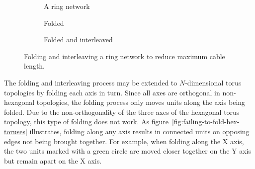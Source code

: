 		\begin{figure}
			\center
			\begin{subfigure}[b]{0.39\linewidth}
				\center
				\caption{A ring network}
				\label{fig:ring-folding-row}
			\end{subfigure}
			\begin{subfigure}[b]{0.24\linewidth}
				\center
				\caption{Folded}
				\label{fig:ring-folding-folded}
			\end{subfigure}
			\begin{subfigure}[b]{0.35\linewidth}
				\center
				\caption{Folded and interleaved}
				\label{fig:ring-folding-interleaved}
			\end{subfigure}
			
			\caption[Folding and interleaving a ring network.]%
			{Folding and interleaving a ring network to reduce maximum cable
			length.}
			\label{fig:ring-folding}
		\end{figure}
		
		The folding and interleaving process may be extended to $N$-dimensional
		torus topologies by folding each axis in turn. Since all axes are
		orthogonal in non-hexagonal topologies, the folding process only moves
		units along the axis being folded. Due to the non-orthogonality of the
		three axes of the hexagonal torus topology, this type of folding does not
		work. As figure~\ref{fig:failing-to-fold-hex-toruses} illustrates, folding
		along any axis results in connected units on opposing edges not being
		brought together. For example, when folding along the X axis, the two units
		marked with a green circle are moved closer together on the Y axis but
		remain apart on the X axis.
		
